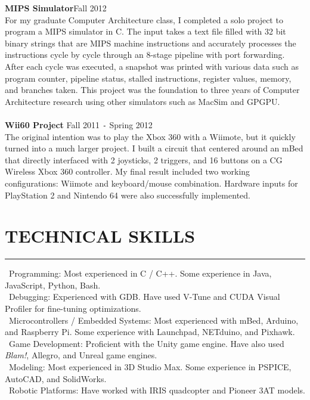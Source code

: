 \documentclass{res}
\begin{document}
\begin{resume}
	{\bf MIPS Simulator}\hfill Fall 2012\\
	For my graduate Computer Architecture class, I completed a solo project to program a MIPS simulator in C. The input takes a text file filled with 32 bit binary strings that are MIPS machine instructions and accurately processes the instructions cycle by cycle through an 8-stage pipeline with port forwarding. After each cycle was executed, a snapshot was printed with various data such as program counter, pipeline status, stalled instructions, register values, memory, and branches taken. This project was the foundation to three years of Computer Architecture research using other simulators such as MacSim and GPGPU.\\\\
	{\bf Wii60 Project} \hfill Fall 2011 \texttt{-} Spring 2012 \\
	The original intention was to play the Xbox 360 with a Wiimote, but it quickly turned into a much larger project. I built a circuit that centered around an mBed that directly interfaced with 2 joysticks, 2 triggers, and 16 buttons on a CG Wireless Xbox 360 controller. My final result included two working configurations: Wiimote and keyboard/mouse combination. Hardware inputs for PlayStation 2 and Nintendo 64 were also successfully implemented.
	
\section{TECHNICAL SKILLS}
	\vspace{0.005in}	
	\rule{\textwidth}{0.5pt}	
		\textbullet \ Programming: Most experienced in C / C++. Some experience in Java, JavaScript, Python, Bash.\\
		\textbullet \ Debugging: Experienced with GDB. Have used V-Tune and CUDA Visual Profiler for fine-tuning optimizations.\\
		\textbullet \ Microcontrollers / Embedded Systems: Most experienced with mBed, Arduino, and Raspberry Pi. Some experience with Launchpad, NETduino, and Pixhawk.\\
		\textbullet \ Game Development: Proficient with the Unity game engine. Have also used \textit{Blam!}, Allegro, and Unreal game engines.\\
		\textbullet \ Modeling: Most experienced in 3D Studio Max. Some experience in PSPICE, AutoCAD, and SolidWorks.\\
		\textbullet \ Robotic Platforms: Have worked with IRIS quadcopter and Pioneer 3AT models.


\end{resume}
\end{document}
